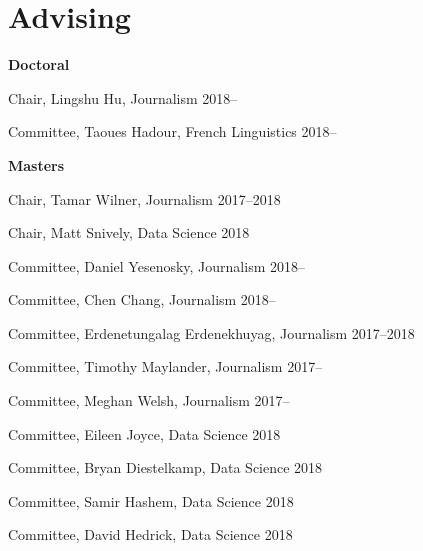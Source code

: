 
\section{Advising}

  \textbf{Doctoral}
    \begin{innerlist}
      \item Chair, Lingshu Hu, Journalism                            \hfill 2018--
      \item Committee, Taoues Hadour, French Linguistics             \hfill 2018--
    \end{innerlist}\vspace{1em}

  \textbf{Masters}
    \begin{innerlist}
      \item Chair, Tamar Wilner, Journalism                          \hfill 2017--2018
      \item Chair, Matt Snively, Data Science                        \hfill 2018
      \item Committee, Daniel Yesenosky, Journalism                  \hfill 2018--
      \item Committee, Chen Chang, Journalism                        \hfill 2018--
      \item Committee, Erdenetungalag Erdenekhuyag, Journalism       \hfill 2017--2018
      \item Committee, Timothy Maylander, Journalism                 \hfill 2017--
      \item Committee, Meghan Welsh, Journalism                      \hfill 2017--
      \item Committee, Eileen Joyce, Data Science                    \hfill 2018
      \item Committee, Bryan Diestelkamp, Data Science               \hfill 2018
      \item Committee, Samir Hashem, Data Science                    \hfill 2018
      \item Committee, David Hedrick, Data Science                   \hfill 2018
    \end{innerlist}\vspace{-.1in}
